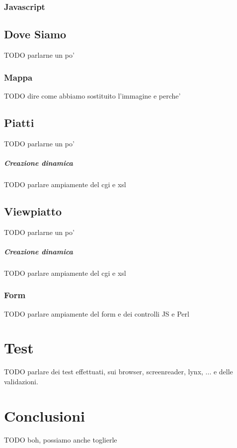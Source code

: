 \documentclass[10pt,a4paper,onecolumn]{article}
\begin{document}
\subsubsection{Javascript}

\subsection{Dove Siamo}

TODO parlarne un po'

\subsubsection{Mappa}

TODO dire come abbiamo sostituito l'immagine e perche'

\subsection{Piatti}

TODO parlarne un po'

\subparagraph{Creazione dinamica}

TODO parlare ampiamente del cgi e xsl

\subsection{Viewpiatto}

TODO parlarne un po'

\subparagraph{Creazione dinamica}

TODO parlare ampiamente del cgi e xsl

\subsubsection{Form}

TODO parlare ampiamente del form e dei controlli JS e Perl

\clearpage

\section{Test}

TODO parlare dei test effettuati, sui browser, screenreader, lynx, ... e delle validazioni.

\section{Conclusioni}

TODO boh, possiamo anche toglierle
\end{document}
